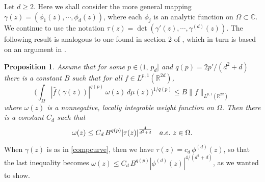 \documentclass[11 pt]{amsart}
\theoremstyle{plain}
\newtheorem{proposition}[theorem]{Proposition}
\numberwithin{equation}{section}
\theoremstyle{plain}
\numberwithin{equation}{section}
\theoremstyle{remark}
\begin{document}
Let $d\ge 2$. Here we shall consider the more general mapping $\gamma(z) = (\phi_1(z), \cdots, \phi_d(z))$, where each $\phi_j$ is an analytic function on $\Omega \subset {{\mathbb {C}}}$. We continue to use the notation $\tau(z) = \det (\gamma '(z), \cdots, \gamma^{(d)}(z))$. The following result is analogous to one found in section 2 of \cite{BOS3}, which in turn is based on an argument in \cite{Obaff}.
\begin{proposition}\label{sharpweight} Assume that for some $p \in (1,\, p_d]$ and $q(p) = 2p'/(d^2+d)$ there is a constant $B$ such that for all $f\in L^{p,1}({{\mathbb {R}}}^{2d})$,
\begin{equation} \label{hypo}
\Big(\int_{\Omega}
 |\widehat f (\gamma(z) )|^{q(p)} \, \omega(z) \, d\mu(z)\Big)^{1/{q(p)}} \le
B \|f\|_{L^{p,1}({{\mathbb {R}}}^{2d})}
\end{equation}
where $\omega(z)$ is a nonnegative, locally integrable weight function on $\Omega$.
Then there is a constant $C_d$ such that
\begin{equation} \label{omega}
\omega(z) \le C_d \, B^{q(p)} |\tau(z)|^{4\over d^2+d}\quad a.e. ~ z \in \Omega .
\end{equation}
\end{proposition}
When $\gamma(z)$ is as in \eqref{compcurve}, then we have $\tau(z) = c_d \, \phi^{(d)}(z)$, so that the last inequality becomes $\omega(z) \le C_d \, B^{q(p)} |\phi^{(d)}(z)|^{4/(d^2+d)}$, as we wanted to show.
\end{document}
